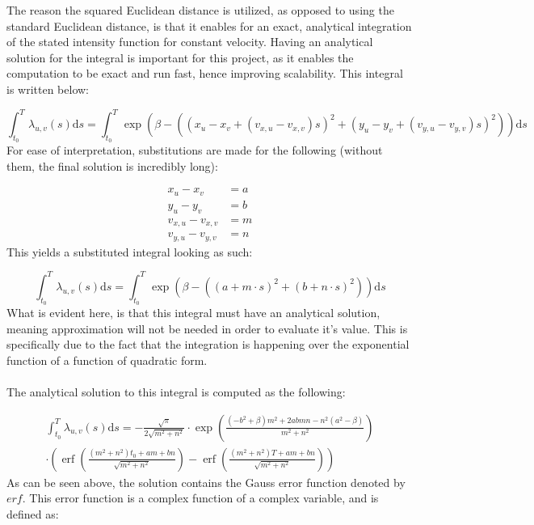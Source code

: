 The reason the squared Euclidean distance is utilized, as opposed to using the standard Euclidean distance, is that it enables for an exact, analytical integration of the stated intensity function for constant velocity.
Having an analytical solution for the integral is important for this project, as it enables the computation to be exact and run fast, hence improving scalability.
This integral is written below:

\begin{equation}
    \int_{t_0}^T \lambda_{u,v}(s) \mathrm{d}s 
    =
    \int_{t_0}^T \exp \left(\beta - \left((x_u - x_v + (v_{x,u} - v_{x,v})s)^2 + (y_u - y_v + ( v_{y,u} - v_{y,v})s)^2\right)\right) \mathrm{d}s
\end{equation}
For ease of interpretation, substitutions are made for the following (without them, the final solution is incredibly long):

\begin{align}
    x_u - x_v &= a
    \\
    y_u - y_v &= b
    \\
    v_{x,u} - v_{x,v} &= m
    \\
    v_{y,u} - v_{y,v} &= n
\end{align}
This yields a substituted integral looking as such:

\begin{equation}
    \int_{t_0}^T \lambda_{u,v}(s) \mathrm{d}s 
    =
    \int_{t_0}^T \exp \left(\beta - \left((a + m \cdot s)^2 + (b + n \cdot s)^2\right)\right) \mathrm{d}s
\end{equation}
What is evident here, is that this integral must have an analytical solution, meaning approximation will not be needed in order to evaluate it's value. 
This is specifically due to the fact that the integration is happening over the exponential function of a function of quadratic form.
\\\\
The analytical solution to this integral is computed as the following:

\begin{align}
    \int_{t_0}^T \lambda_{u,v}(s) \mathrm{d}s
    = 
    -\frac{\sqrt{\pi}}{2 \sqrt{m^{2}+n^{2}}}
    \cdot
    \exp\left(\frac{\left(-b^{2}+\beta\right) m^{2}+2abmn-n^{2}(a^{2}-\beta)}{m^{2}+n^{2}}\right)
    \\
    \cdot 
    \left(
    \operatorname{erf}\left(\frac{\left(m^{2}+n^{2}\right)t_{0}+am+b n}{\sqrt{m^{2}+n^{2}}}\right)
    -\operatorname{erf}\left(\frac{\left(m^{2}+n^{2}\right)T+am+b n}{\sqrt{m^{2}+n^{2}}}\right)
    \right)
    \label{eq:analytical_integral}
\end{align}
As can be seen above, the solution contains the Gauss error function denoted by $erf$.
This error function is a complex function of a complex variable, and is defined as:


